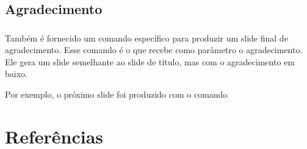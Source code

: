 \documentclass[aspectratio=169]{beamer}
\begin{document}
\subsection{Agradecimento}

\begin{frame}[t]\frametitle{\secname}\framesubtitle{\subsecname}
  Também é fornecido um comando específico para produzir um slide final de agradecimento.
  Esse comando é o  que recebe como parâmetro o agradecimento.
  Ele gera um slide semelhante ao slide de título, mas com o agradecimento em baixo.

  Por exemplo, o próximo slide foi produzido com o comando

  
\end{frame}


\section*{Referências}
\begin{frame}[t]\frametitle{\secname}
    \footnotesize
    
\end{frame}
\end{document}
